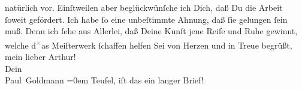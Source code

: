 \begin{ledgroupsized}[t]{13cm}
                  {\pb}natürlich vor. Einſtweilen aber beglückwünſche
               ich Dich, daß Du die Arbeit
               ſoweit gefördert. Ich habe ſo eine unbeſtimmte Ahnung, daß ſie gelungen ſein muß.
               Denn ich ſehe aus Allerlei, daß Deine Kunſt jene Reife und Ruhe gewinnt, welche d\substVorne{}\textsuperscript{\textcolor{gray}{×}}\substDazwischen{}a\substHinten{}s Meiſterwerk ſchaffen
                  helfen{\dotsfour}\pend
           \pstart
           Sei von Herzen und in Treue begrüßt, mein lieber Arthur!{\\[\baselineskip]} Dein{\\[\baselineskip]}\spacefill\mbox{Paul Goldmann}\pend
           \leftskip=0em{}\pstart
           \noindent{}Teufel, iſt das ein langer Brief!\pend
           
         
         \endnumbering{}\end{ledgroupsized}  \newcommand{\dateiname}{L02608}\newcommand{\titel}{Paul Goldmann an Arthur Schnitzler, 29. 7. [1894]}\newcommand{\editorInnen}{Martin Anton Müller und Laura Untner}
      